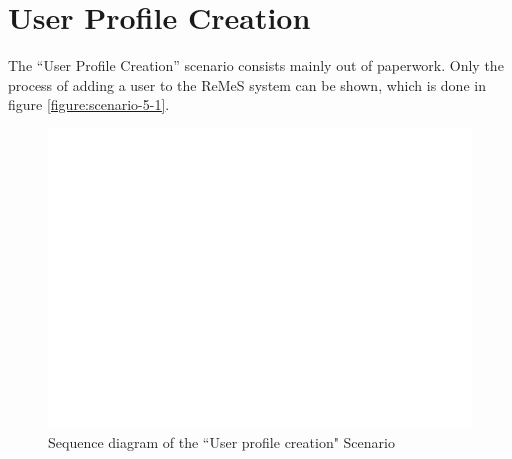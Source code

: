 \section{User Profile Creation}
\label{scenario:user-profile-creation}

\npar The ``User Profile Creation'' scenario consists mainly out of paperwork.
Only the process of adding a user to the ReMeS system can be shown, which is
done in figure \ref{figure:scenario-5-1}.

\begin{figure}[H]
	\begin{centering}
		\includegraphics[width=\textwidth]{figs/scenario-5-1.pdf}
		\caption{Sequence diagram of the ``User profile creation" Scenario}
		\label{fig:scenario-5-1}
	\end{centering}
\end{figure}

